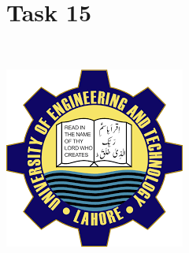 \documentclass{article}
\begin{document}
\section{Task 15}
\\
\begin{center}
\includegraphics{UET.png}
\end{center}
\end{document}
